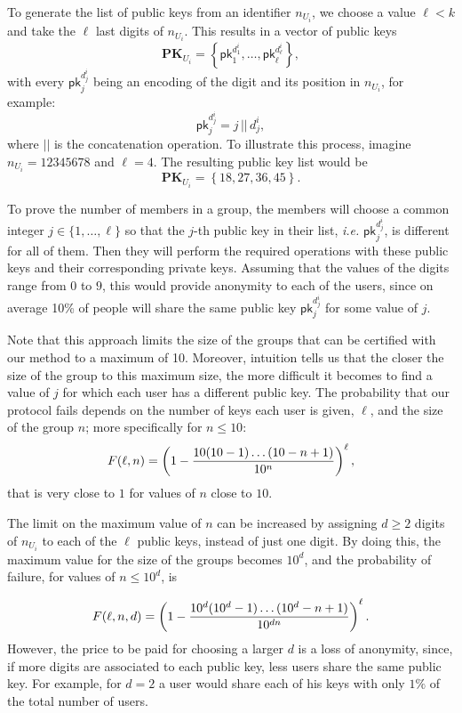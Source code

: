 \documentclass[11pt]{llncs}
\def\pk{\mathsf{pk}}
\begin{document}
To generate the list of public keys from an identifier $n_{U_i}$,
we choose a value $\ell < k$ and take the $\ell$ last digits
of $n_{U_i}$.
This results in a vector of public keys
$$\mathbf{PK}_{U_i}  = \left\{ \pk_{1}^{d_{1}^{i}} , \dots , \pk_{\ell}^{d_{\ell}^{i}}\right\},$$
with every $\pk_{j}^{d_{j}^{i}}$ being an encoding of the
digit and its position in $n_{U_i}$, for example:
$$\pk_{j}^{d_{j}^{i}} = j \, || \, d_{j}^{i},$$
where $||$ is the concatenation operation.
To illustrate this process, imagine $n_{U_i} = 12345678$
and $\ell = 4$. The resulting public key list would be
$$\mathbf{PK}_{U_i} = \left\{ 18, 27, 36, 45 \right\}.$$

To prove the number of members in a group,
the members will choose a common integer $j \in \{1,\dots , \ell\}$
so that the $j$-th public key in their list, \emph{i.e.}
$\pk_{j}^{d_{j}^{i}}$, is different for all of them.
Then they will perform the required operations with these public
keys and their corresponding private keys.
Assuming that the values of the digits range from
$0$ to $9$, this would provide anonymity to each
of the users, since on average 10\% of people
will share the same public key $\pk_{j}^{d_{j}^{i}}$
for some value of $j$.

Note that this approach limits the size of the groups
that can be certified with our method to a maximum
of 10. Moreover, intuition tells us that
the closer the size of the group to this maximum size,
the more difficult it becomes to find a value of $j$ for
which each user has a different public key.
The probability that our protocol fails depends
on the number of keys each user is given, $\ell$, and
the size of the group $n$; more specifically for
$n\le10$:
$$F(\ell,n) = \left( 1 - {10(10-1)\dots(10-n+1)\over10^n} \right)^\ell,$$
that is very close to $1$ for values of $n$ close to
$10$.

The limit on the maximum value of $n$ can be
increased by assigning $d\ge2$ digits of $n_{U_i}$ to each
of the $\ell$ public keys,
instead of just one digit.
By doing this, the maximum value for the size
of the groups becomes $10^d$, and the probability of
failure, for values of $n\le10^d$, is

$$F(\ell,n,d) = \left( 1 - {10^d(10^d-1)\dots(10^d-n+1)\over10^{dn}} \right)^\ell.$$
However, the price to be paid for choosing a larger
$d$ is a loss of anonymity,
since, if more digits are associated to each public key,
less users share the same public key. For example,
for $d=2$ a user would share each of his keys with
only $1\%$ of the total number of users.
\end{document}
